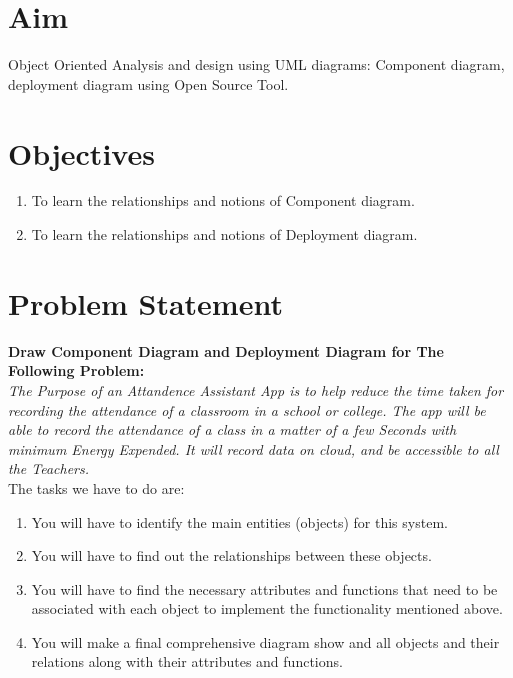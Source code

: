 \documentclass[11pt]{article}
\begin{document}
\tableofcontents
\thispagestyle{empty}
\clearpage

\setcounter{page}{1}

\section{Aim}
Object Oriented Analysis and design using UML diagrams: Component diagram, deployment diagram using Open Source Tool.

\section{Objectives}

\begin{enumerate}
	\item To learn the relationships and notions of Component diagram.
	\item To learn the relationships and notions of Deployment diagram.
\end{enumerate}

\section{Problem Statement}

\textbf{Draw Component Diagram and Deployment Diagram for The Following Problem:} \\

\textit{The Purpose of an Attandence Assistant App is to help reduce the time taken for recording the attendance of a classroom in a school or college. The app will be able to record the attendance of a class in a matter of a few Seconds with minimum Energy Expended. It will record data on cloud, and be accessible to all the Teachers.}\\

The tasks we have to do are:
\begin{enumerate}
	\item You will have to identify the main entities (objects) for this system.
	\item You will have to find out the relationships between these objects.
	\item You will have to find the necessary attributes and functions that need to be associated
	      with each object to implement the functionality mentioned above.
	\item You will make a final comprehensive diagram show and all objects and their relations
	      along with their attributes and functions.
\end{enumerate}
\end{document}
